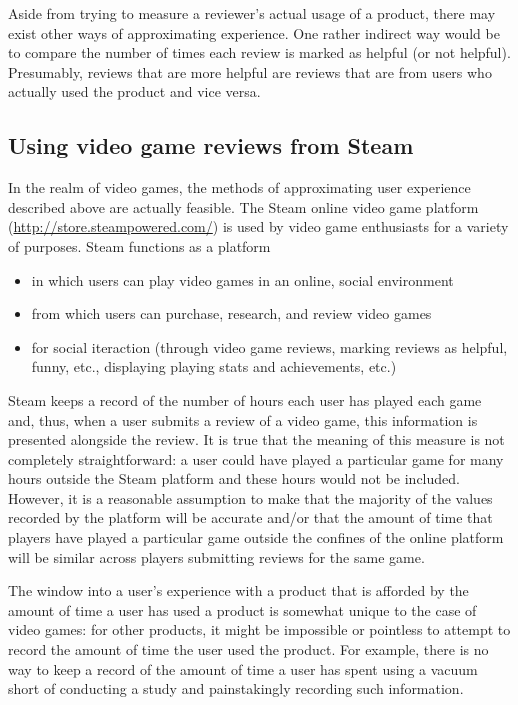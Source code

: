 \documentclass[9pt]{article}
\begin{document}
Aside from trying to measure a reviewer's actual usage of a product, there may exist other ways of approximating experience. One rather indirect way would be to compare the number of times each review is marked as helpful (or not helpful). Presumably, reviews that are more helpful are reviews that are from users who actually used the product and vice versa.

\subsection{Using video game reviews from Steam}
\label{ssec:steam}

In the realm of video games, the methods of approximating user experience described above are actually feasible. The Steam online video game platform (\url{http://store.steampowered.com/}) is used by video game enthusiasts for a variety of purposes. Steam functions as a platform

\begin{itemize}
\item in which users can play video games in an online, social environment
\item from which users can purchase, research, and review video games
\item for social iteraction (through video game reviews, marking reviews as helpful, funny, etc., displaying playing stats and achievements, etc.)
\end{itemize}

Steam keeps a record of the number of hours each user has played each game and, thus, when a user submits a review of a video game, this information is presented alongside the review. It is true that the meaning of this measure is not completely straightforward: a user could have played a particular game for many hours outside the Steam platform and these hours would not be included. However, it is a reasonable assumption to make that the majority of the values recorded by the platform will be accurate and/or that the amount of time that players have played a particular game outside the confines of the online platform will be similar across players submitting reviews for the same game.

The window into a user's experience with a product that is afforded by the amount of time a user has used a product is somewhat unique to the case of video games: for other products, it might be impossible or pointless to attempt to record the amount of time the user used the product. For example, there is no way to keep a record of the amount of time a user has spent using a vacuum short of conducting a study and painstakingly recording such information.
\end{document}
